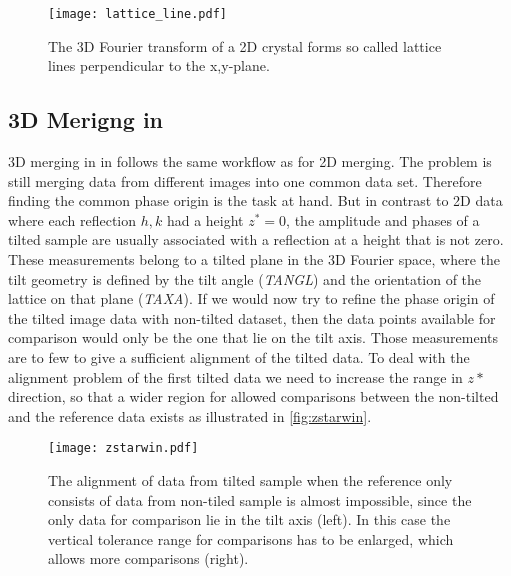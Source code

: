 	\begin{figure}
		\centering
		\texttt{[image: lattice\_line.pdf]}
		\caption{The 3D Fourier transform of a 2D crystal forms so called lattice lines perpendicular to the x,y-plane.}
		\label{fig:lattice_line}
	\end{figure}


\subsection{3D Merigng in {\twodx}}
\label{3d_merigng_2dx}

 3D merging in {\twodx} in follows the same workflow as for 2D merging. The problem is still merging data from different images into one common data set. Therefore finding the common phase origin is the task at hand. But in contrast to 2D data  where each reflection $h,k$ had a height $z^*=0$, the amplitude and phases of a tilted sample are usually associated with a reflection at a height that is not zero. These measurements belong to a tilted plane in the 3D Fourier space, where the tilt geometry is defined by the tilt angle (\textit{TANGL}) and the orientation of the lattice on that plane (\textit{TAXA}). If we would now try to refine the phase origin of the tilted image data with non-tilted dataset, then the data points available for comparison would only be the one that lie on the tilt axis. Those measurements are to few to give a sufficient alignment of the tilted data. To deal with the alignment problem of the first tilted data we need to increase the range in $z*$ direction, so that a wider region for allowed comparisons between the non-tilted and the reference data exists as illustrated in \autoref{fig:zstarwin}. \\

	\begin{figure}[H]
		\centering
		\texttt{[image: zstarwin.pdf]}
		\caption{The alignment of data from tilted sample when the reference only consists of data from non-tiled sample is almost impossible, since the only data for comparison lie in the tilt axis (left). In this case the vertical tolerance range for comparisons has to be enlarged, which allows more comparisons (right).}
		\label{fig:zstarwin}
	\end{figure}

